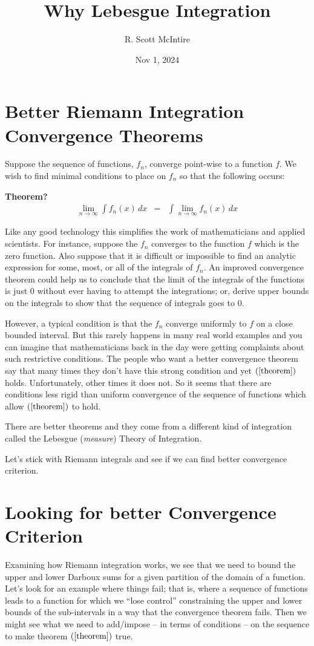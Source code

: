 \documentclass{article}
\title{Why Lebesgue Integration}
\author{R. Scott McIntire}
\date{Nov 1, 2024}
\begin{document}
\maketitle


\section{Better Riemann Integration Convergence Theorems}
Suppose the sequence of functions, $f_n$, converge point-wise to a function $f$.
We wish to find minimal conditions to place on $f_n$ so that the following occurs:

{\bf Theorem?}
\begin{eqnarray}
	\lim_{n \rightarrow \infty}\limits \int f_n(x) \, dx & = & \int \lim_{n \rightarrow \infty}\limits f_n(x) \, dx \label{theorem}
\end{eqnarray}

Like any good technology this simplifies the work of mathematicians 
and applied scientists. For instance, suppose the $f_n$ converges to the function $f$ 
which is the zero function. Also suppose that it is difficult or impossible to 
find an analytic expression for some, most, or all of the integrals of $f_n$. 
An improved convergence theorem could help us to conclude that the limit of the integrals of 
the functions is just $0$ without ever having to attempt the integrations; or, 
derive upper bounds on the integrals to show that 
the sequence of integrals goes to $0$.

However, a typical condition is that the $f_n$ converge 
uniformly to $f$ on a close bounded interval. 
But this rarely happens in many real world examples and you can imagine that
mathematicians back in the day
were getting complaints about such restrictive 
conditions. The people who want a better convergence theorem say that many 
times they don't have this strong condition and yet $(\ref{theorem})$
holds. Unfortunately, other times it does not. So it seems that there are 
conditions less rigid than uniform convergence of the sequence of 
functions which allow $(\ref{theorem})$ to hold.

There are better theorems and they come from a different kind of integration called 
the Lebesgue ({\em measure\/}) Theory of Integration.

Let's stick with Riemann integrals and see if we can find better convergence 
criterion.

\section{Looking for better Convergence Criterion}
Examining how Riemann integration works, we see that we need to bound the upper 
and lower Darboux sums for a given partition of the domain of a function. 
Let's look for an example where things fail; that is, where 
a sequence of functions leads to a function for which we ``lose control'' 
constraining the upper and lower bounds of the sub-intervals in a way that the 
convergence theorem fails. Then we might see what we need to add/impose 
-- in terms of conditions -- on the sequence to make theorem 
$(\ref{theorem})$ true.
\end{document}

